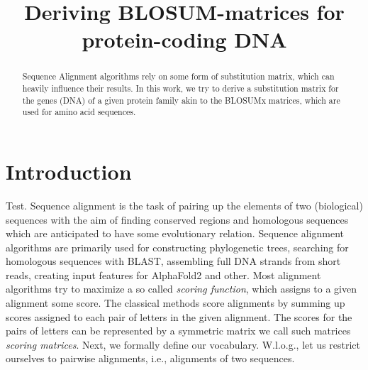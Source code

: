 \documentclass{article}
\title{Deriving BLOSUM-matrices for protein-coding DNA}
\begin{document}
\maketitle

\begin{abstract}
    Sequence Alignment algorithms rely on some form of substitution matrix,
    which can heavily influence their results. In this work, we try to derive a
    substitution matrix for the genes (DNA) of a given protein family akin to
    the BLOSUMx matrices, which are used for amino acid sequences.
\end{abstract}

\tableofcontents

\section{Introduction} Test. Sequence alignment is the task of pairing up the
elements of two (biological) sequences with the aim of finding conserved
regions and homologous sequences which are anticipated to have some
evolutionary relation. Sequence alignment algorithms are primarily used for
constructing phylogenetic trees, searching for homologous sequences with BLAST,
assembling full DNA strands from short reads, creating input features for
AlphaFold2 and other.
Most alignment algorithms try to maximize a so called \emph{scoring function},
which assigns to a given alignment some score. The classical methods score
alignments by summing up scores assigned to each pair of letters in the given
alignment. The scores for the pairs of letters can be represented by a
symmetric matrix \- we call such matrices \emph{scoring matrices}. Next, we
formally define our vocabulary. W.l.o.g., let us restrict ourselves to pairwise
alignments, i.e., alignments of two sequences.
\end{document}

